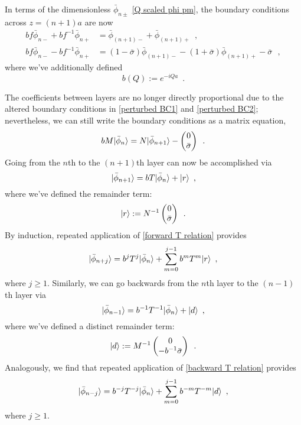 \documentclass[submission, Phys]{SciPost}
\newcommand{\bpm}{\begin{pmatrix}}
\newcommand{\epm}{\end{pmatrix}}
\DeclarePairedDelimiter\ket{\lvert}{\rangle}
\begin{document}
In terms of the dimensionless $\bar\phi_{n\pm}$ \eqref{Q scaled phi pm}, the boundary conditions across $z=(n+1)a$ are now
\begin{align}
    \label{perturbed BC1}
    bf \bar\phi_{n-} + bf^{-1}\bar\phi_{n+} &= \bar\phi_{(n+1)-} + \bar\phi_{(n+1)+}
    \,\,\,,
    \\
    \label{perturbed BC2}
    bf \bar\phi_{n-} - bf^{-1}\bar\phi_{n+} &= (1-\bar\sigma)\bar\phi_{(n+1)-}-(1+\bar\sigma)\bar\phi_{(n+1)+} - \bar\sigma
    \,\,\,\,,
\end{align}
where we've additionally defined
\begin{equation}
    \label{b def}
    b(Q):=e^{-i Q a}
    \,\,\,.
\end{equation}

The coefficients between layers are no longer directly proportional due to the altered boundary conditions in \eqref{perturbed BC1} and \eqref{perturbed BC2}; nevertheless, we can still write the boundary conditions as a matrix equation,
\begin{equation}
    \label{perturbed matrix BC}
    bM\ket{\bar\phi_n} = N\ket{\bar \phi_{n+1}}
    -
    \bpm
    0
    \\
    \bar\sigma
    \epm
    \,\,\,.
\end{equation}
Going from the $n$th to the $(n+1)$th layer can now be accomplished via
\begin{equation}
    \label{forward T relation}
    \ket{\bar\phi_{n+1}}
    =
    bT\ket{\bar\phi_n}+\ket r
    \,\,\,,
\end{equation}
where we've defined the remainder term:
\begin{equation}
    \label{r def}
    \ket r := N^{-1}\bpm
    0
    \\
    \bar\sigma
    \epm
    \,\,\,.
\end{equation}
By induction, repeated application of \eqref{forward T relation} provides
\begin{equation}
    \label{forward j T relation}
    \ket{\bar\phi_{n+j}} = b^j T^j\ket{\bar\phi_{n}} + \sum_{m=0}^{j-1} b^m T^m\ket r
    \,\,\,,
\end{equation}
where $j\ge1$.  Similarly, we can go backwards from the $n$th layer to the $(n-1)$th layer via
\begin{equation}
    \label{backward T relation}
    \ket{\bar\phi_{n-1}} = b^{-1}T^{-1}\ket{\bar\phi_{n}} + \ket d
    \,\,\,,
\end{equation}
where we've defined a distinct remainder term:
\begin{equation}
    \label{d def}
    \ket d:=M^{-1}
    \bpm
    0
    \\
    -b^{-1}\bar\sigma
    \epm
    \,\,\,.
\end{equation}
Analogously, we find that repeated application of \eqref{backward T relation} provides
\begin{equation}
    \label{backward j T relation}
    \ket{\bar\phi_{n-j}}
    =
    b^{-j} T^{-j}\ket{\bar\phi_n} +\sum_{m=0}^{j-1}b^{-m}T^{-m}\ket d
    \,\,\,,
\end{equation}
where $j\ge1$.
\end{document}
